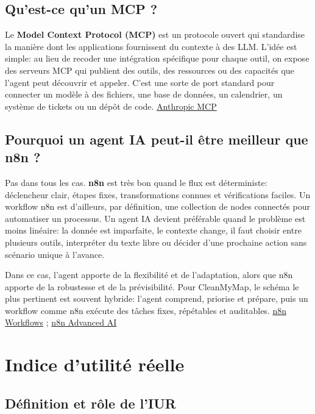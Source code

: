 \documentclass[
  10pt,
  a4paper,
  DIV=11,
  numbers=noendperiod,
  oneside]{scrreprt}
\let\oldtextbf\textbf
\renewcommand{\textbf}[1]{\oldtextbf{\textcolor{cmmnavy}{#1}}}
\begin{document}
\subsection{Qu'est-ce qu'un MCP ?}\label{quest-ce-quun-mcp}

Le \textbf{Model Context Protocol (MCP)} est un protocole ouvert qui
standardise la manière dont les applications fournissent du contexte à
des LLM. L'idée est simple: au lieu de recoder une intégration
spécifique pour chaque outil, on expose des serveurs MCP qui publient
des outils, des ressources ou des capacités que l'agent peut découvrir
et appeler. C'est une sorte de port standard pour connecter un modèle à
des fichiers, une base de données, un calendrier, un système de tickets
ou un dépôt de code.
\href{https://docs.anthropic.com/en/docs/mcp}{Anthropic MCP}

\subsection{Pourquoi un agent IA peut-il être meilleur que n8n
?}\label{pourquoi-un-agent-ia-peut-il-uxeatre-meilleur-que-n8n}

Pas dans tous les cas. \textbf{n8n} est très bon quand le flux est
déterministe: déclencheur clair, étapes fixes, transformations connues
et vérifications faciles. Un workflow n8n est d'ailleurs, par
définition, une collection de nodes connectés pour automatiser un
processus. Un agent IA devient préférable quand le problème est moins
linéaire: la donnée est imparfaite, le contexte change, il faut choisir
entre plusieurs outils, interpréter du texte libre ou décider d'une
prochaine action sans scénario unique à l'avance.

Dans ce cas, l'agent apporte de la flexibilité et de l'adaptation, alors
que n8n apporte de la robustesse et de la prévisibilité. Pour
CleanMyMap, le schéma le plus pertinent est souvent hybride: l'agent
comprend, priorise et prépare, puis un workflow comme n8n exécute des
tâches fixes, répétables et auditables.
\href{https://docs.n8n.io/workflows/}{n8n Workflows} ;
\href{https://docs.n8n.io/advanced-ai/}{n8n Advanced AI}

\section{Indice d'utilité réelle}\label{indice-dutilituxe9-ruxe9elle}

\subsection{Définition et rôle de
l'IUR}\label{duxe9finition-et-ruxf4le-de-liur}
\end{document}
